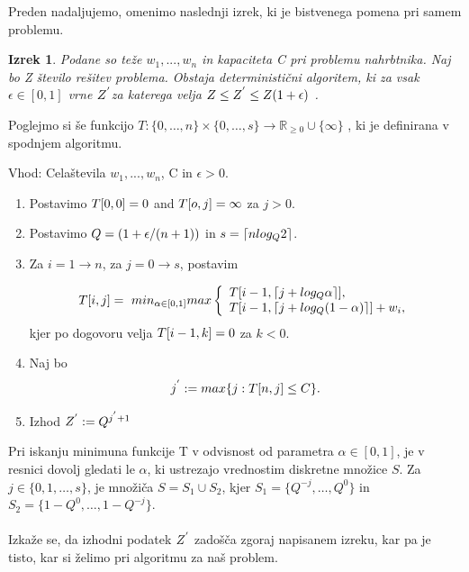 \documentclass[a4paper,12pt]{article}
\newtheorem{theorem}{Izrek}
\begin{document}
\vspace{3mm}
\noindent Preden nadaljujemo, omenimo naslednji izrek, ki je bistvenega pomena pri samem problemu.

 \begin{theorem}
Podane so teže \(w_{1},...,w_{n}\) in kapaciteta C pri problemu nahrbtnika. Naj bo Z število rešitev problema. Obstaja deterministični algoritem, ki za vsak \( \epsilon \in [0,1]\) vrne \(\uppercase{z}^{'} \)za katerega velja  
\( \uppercase{z} \leq \uppercase{z}^{'} \leq \uppercase{z}(1 + \epsilon) \) .
\end{theorem}


\noindent Poglejmo si še funkcijo $T : \{0, \ldots, n\} \times \{0, \ldots, s\} \rightarrow \mathbb{R}_{\geq 0} \cup \{\infty \}  $ , ki je definirana v spodnjem algoritmu.


\begin{framed}
Vhod: Celaštevila \(w_{1},...,w_{n}\), C in \( \epsilon > 0\).
\begin{enumerate}
\item Postavimo \(\uppercase{t}[0,0] = 0\) and \(\uppercase{t}[o,j] = \infty \) za \(j > 0\).
\item Postavimo \( \uppercase{q} = ( 1+ \epsilon/(n + 1))\) in \( s= \lceil n log_{\uppercase{q}}2 \rceil\).
\item Za \( i = 1 \to n\), za \( j = 0 \to s \), postavim

\[ 
\uppercase{t}[i, j]=\ min_{\alpha \in [0,1]} max \left\{
\begin{array}{ll}
      \uppercase{t}[i - 1, \lceil j + log_{\uppercase{q}}\alpha \rceil ], \\
      \uppercase{t}[i - 1, \lceil j + log_{\uppercase{q}}(1 - \alpha) \rceil ] + w_{i}, 
      
\end{array} 
\right. 
\]
kjer po dogovoru velja \( \uppercase{t}[i - 1, k] = 0 \) za \( k <0\).

\item Naj bo
\[
j^{'} := max\{j : \uppercase{t}[n, j] \leq \uppercase{C} \}.
\]
\item Izhod \(\uppercase{Z}^{'} := \uppercase{Q}^{j^{'} + 1} \)
\end{enumerate}
\end{framed}



\noindent Pri iskanju minimuna funkcije T v odvisnost od parametra $\alpha \in [0,1]$, je v resnici dovolj gledati le $\alpha$, ki ustrezajo vrednostim diskretne množice $S$. Za $ j \in \{0, 1, \ldots, s\}$, je množiča $S = S_{1} \cup S_{2}$, kjer $S_{1} = \{Q^{-j}, \ldots, Q^0\}$ in $S_{2} = \{1-Q^{0}, \ldots, 1- Q^{-j}\}$. \\
\vspace{3mm}\\
\noindent Izkaže se, da izhodni podatek \(\uppercase{z}^{'}\) zadošča zgoraj napisanem izreku, kar pa je tisto, kar si želimo pri algoritmu za naš problem.\\
\end{document}
